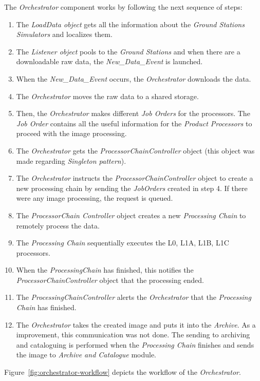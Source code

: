The \emph{Orchestrator} component works by following the next sequence of steps:
\begin{enumerate}
\item The \emph{LoadData object} gets all the information about the \emph{Ground
    Stations Simulators} and localizes them.
\item The \emph{Listener object} pools to the \emph{Ground Stations} and when there are
  a downloadable raw data, the \emph{New\_Data\_Event} is launched.
\item  When the \emph{New\_Data\_Event} occurs, the \emph{Orchestrator} downloads the data.
\item  The \emph{Orchestrator} moves the raw data to a shared storage.
\item Then, the \emph{Orchestrator} makes different \emph{Job Orders} for the processors. The \emph{Job Order} contains all the useful information for the \emph{Product Processors} to proceed with the image processing.
\item The \emph{Orchestrator} gets the \emph{ProcessorChainController} object (this object was made regarding \emph{Singleton pattern}).
\item The \emph{Orchestrator} instructs the \emph{ProcessorChainController}
  object to create a new processing chain by sending the \emph{JobOrders}
  created in step 4. If there were any image processing, the request is queued.
\item The \emph{ProcessorChain Controller} object creates a new \emph{Processing
  Chain} to remotely process the data.
\item The \emph{Processing Chain} sequentially executes the L0, L1A, L1B, L1C processors.
\item When the \emph{ProcessingChain} has finished, this notifies the \emph{ProcessorChainController} object that the processing ended.
\item The \emph{ProcessingChainController} alerts the \emph{Orchestrator} that the \emph{Processing Chain} has finished.
\item The \emph{Orchestrator} takes the created image and puts it into the
  \emph{Archive}. As a improvement, this communication was not done. The
  sending to archiving and cataloguing is performed when the \emph{Processing Chain}
  finishes and sends the image to \emph{Archive and Catalogue} module. 
\end{enumerate}

Figure~\ref{fig:orchestrator-workflow} depicts the workflow of the \emph{Orchestrator}.

